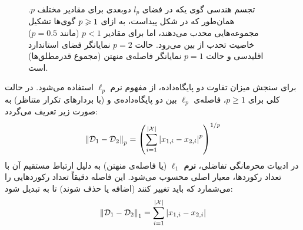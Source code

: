 \begin{figure}[htbp]
    \centering
    \caption[تجسم هندسی گوی یکه در فضای $l_p$ دو‌بعدی]{تجسم هندسی گوی یکه در فضای $l_p$ دو‌بعدی برای مقادیر مختلف $p$. همان‌طور که در شکل پیداست، به ازای $p \geqslant 1$ گوی‌ها تشکیل مجموعه‌هایی محدب می‌دهند، اما برای مقادیر $p < 1$ (مانند $p=0.5$) خاصیت تحدب از بین می‌رود. حالت $p=2$ نمایانگر فضای استاندارد اقلیدسی و حالت $p=1$ نمایانگر فاصله‌ی منهتن (مجموع قدرمطلق‌ها) است.}
    \label{fig:lp-unit-balls}
\end{figure}

\begin{تعریف}
\label{def:db-distance}
برای سنجش میزان تفاوت دو پایگاه‌داده، از مفهوم نرم $\ell_p$ استفاده می‌شود. در حالت کلی برای $p \ge 1$، فاصله‌ی $\ell_p$ بین دو پایگاه‌داده‌ی \Dset[1] و \Dset[2] (با بردارهای تکرار متناظر) به صورت زیر تعریف می‌گردد:
\begin{equation}
\label{def:lp-norm}
\left\| \Dset[1] - \Dset[2] \right\|_p = \left( \sum_{i=1}^{|\Xset|} \left| x_{1,i} - x_{2,i} \right|^p \right)^{1/p}
\end{equation}
در ادبیات محرمانگی تفاضلی، \textbf{نرم $\ell_1$} (یا فاصله‌ی منهتن) به دلیل ارتباط مستقیم آن با تعداد رکوردها، معیار اصلی محسوب می‌شود. این فاصله دقیقاً تعداد رکوردهایی را می‌شمارد که باید تغییر کنند (اضافه یا حذف شوند) تا \Dset[1] به \Dset[2] تبدیل شود:
\[
\left\| \Dset[1] - \Dset[2] \right\|_1 = \sum_{i=1}^{|\Xset|} \left| x_{1,i} - x_{2,i} \right|
\]
\end{تعریف}

